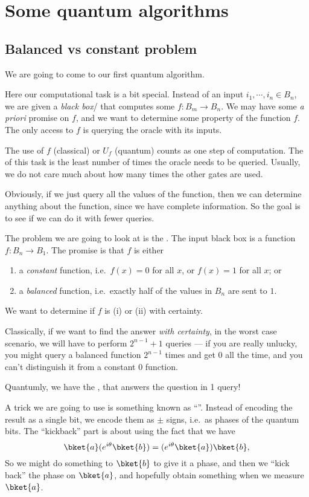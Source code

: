 \documentclass[a4paper]{article}
\begin{document}
\section{Some quantum algorithms}
\subsection{Balanced vs constant problem}
We are going to come to our first quantum algorithm.

Here our computational task is a bit special. Instead of an input $i_1, \cdots, i_n \in B_n$, we are given a \emph{black box}/ that computes some $f: B_m \to B_n$. We may have some \emph{a priori} promise on $f$, and we want to determine some property of the function $f$. The only access to $f$ is querying the oracle with its inputs.

The use of $f$ (classical) or $U_f$ (quantum) counts as one step of computation. The  of this task is the least number of times the oracle needs to be queried. Usually, we do not care much about how many times the other gates are used.

Obviously, if we just query all the values of the function, then we can determine anything about the function, since we have complete information. So the goal is to see if we can do it with fewer queries.

The problem we are going to look at is the . The input black box is a function $f: B_n \to B_1$. The promise is that $f$ is either
\begin{enumerate}
  \item a \emph{constant} function, i.e.\ $f(x) = 0$ for all $x$, or $f(x) = 1$ for all $x$; or
  \item a \emph{balanced} function, i.e.\ exactly half of the values in $B_n$ are sent to $1$.
\end{enumerate}
We want to determine if $f$ is (i) or (ii) with certainty.

Classically, if we want to find the answer \emph{with certainty}, in the worst case scenario, we will have to perform $2^{n - 1} + 1$ queries --- if you are really unlucky, you might query a balanced function $2^{n - 1}$ times and get $0$ all the time, and you can't distinguish it from a constant $0$ function.

Quantumly, we have the , that answers the question in 1 query!

A trick we are going to use is something known as ``''. Instead of encoding the result as a single bit, we encode them as $\pm$ signs, i.e.\ as phases of the quantum bits. The ``kickback'' part is about using the fact that we have
\[
  \bket{a} (e^{i\theta}\bket{b}) = (e^{i\theta}\bket{a})\bket{b},
\]
So we might do something to $\bket{b}$ to give it a phase, and then we ``kick back'' the phase on $\bket{a}$, and hopefully obtain something when we measure $\bket{a}$.
\end{document}
